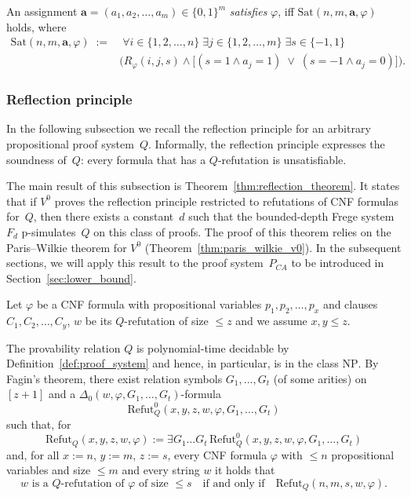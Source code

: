 \documentclass{article}
\theoremstyle{plain}
\theoremstyle{definition}
\newcommand{\tuple}{\mathbf}
\begin{document}
An assignment $\tuple a = (a_1, a_2, \dots, a_m) \in \{0,1\}^m$ \emph{satisfies} $\varphi$, iff $\mathrm{Sat}(n,m, \tuple a, \varphi)$ holds, where 
\begin{align*}
\mathrm{Sat}(n,m, \tuple a, \varphi) \; := &\;   \forall i \in \{1, 2, \dots, n\} \;
\exists j \in \{1, 2, \dots, m\}\;
\exists s \in \{-1,1\}\; \\&
\bigl(R_\varphi(i,j,s) \wedge
\big[(s=1 \wedge a_j=1)\;\vee\;(s=-1 \wedge a_j=0)\bigr]\bigr).
\end{align*}


\subsubsection{Reflection principle}\label{reflection_principle}

In the following subsection we recall the reflection principle for an arbitrary
propositional proof system~$Q$. Informally, the reflection principle expresses the
soundness of~$Q$: every formula that has a $Q$-refutation is unsatisfiable.

The main result of this subsection is Theorem~\ref{thm:reflection_theorem}. It states
that if $V^0$ proves the reflection principle restricted to refutations of CNF formulas for~$Q$, then
there exists a constant~$d$ such that the bounded-depth Frege system~$F_d$
p-simulates~$Q$ on this class of proofs. The proof of this theorem relies on the
Paris--Wilkie theorem for $V^0$ (Theorem~\ref{thm:paris_wilkie_v0}). In the subsequent sections, we will apply this result to the
proof system~$P_{CA}$ to be introduced in Section~\ref{sec:lower_bound}.

Let $\varphi$ be a CNF formula with propositional variables $p_1, p_2, \dots, p_x$ and clauses $C_1, C_2, \dots, C_y$, $w$ be its $Q$-refutation of size $\leq z$ and we assume $x,y \le z$.

The provability relation 
$Q$ is polynomial-time decidable by Definition~\ref{def:proof_system} and hence, in particular, is in 
the class $\mathrm{NP}$. By Fagin’s theorem, there exist relation symbols $G_1,\ldots,G_t$ (of some arities) on $[z+1]$ 
and a $\Delta_0(w,\varphi,G_1,\ldots,G_t)$-formula
\[
\mathrm{Refut}^0_Q(x,y,z,w,\varphi,G_1,\ldots,G_t)
\]
such that, for
\[
\mathrm{Refut}_Q(x,y,z,w,\varphi) := \exists G_1 \ldots G_t \, 
  \mathrm{Refut}^0_Q(x,y,z,w,\varphi,G_1,\ldots,G_t)
\]
and, for all $x := n$, $y := m$, $z := s$, every CNF formula $\varphi$ with $\le n$ propositional variables 
and size $\le m$ and every string $w$ it holds that
\[
w \text{ is a $Q$-refutation of $\varphi$ of size } \le s 
\quad\text{if and only if}\quad 
\mathrm{Refut}_Q(n,m,s,w,\varphi).
\]
\end{document}
